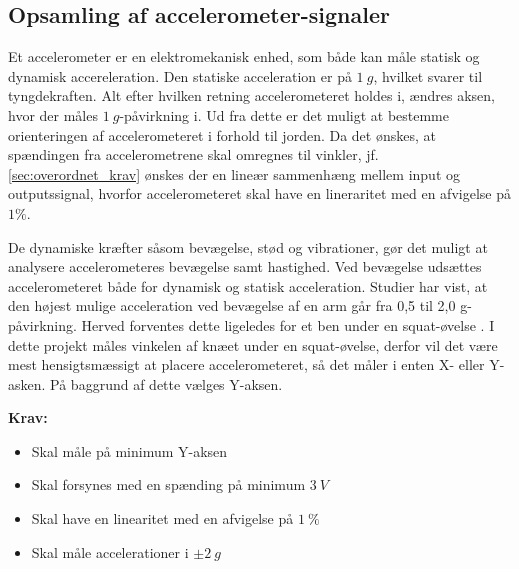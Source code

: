 \subsection{Opsamling af accelerometer-signaler} \label{sec:acc_teori}
Et accelerometer er en elektromekanisk enhed, som både kan måle statisk og dynamisk accereleration. Den statiske acceleration er på $1~g$, hvilket svarer til tyngdekraften. Alt efter hvilken retning accelerometeret holdes i, ændres aksen, hvor der måles $1~g$-påvirkning i. Ud fra dette er det muligt at bestemme orienteringen af accelerometeret i forhold til jorden. Da det ønskes, at spændingen fra accelerometrene skal omregnes til vinkler, jf. \autoref{sec:overordnet_krav} ønskes der en lineær sammenhæng mellem input og outputssignal, hvorfor accelerometeret skal have en lineraritet med en afvigelse på $1\%$. 

De dynamiske kræfter såsom bevægelse, stød og vibrationer, gør det muligt at analysere accelerometeres bevægelse samt hastighed. Ved bevægelse udsættes accelerometeret både for dynamisk og statisk acceleration. Studier har vist, at den højest mulige acceleration ved bevægelse af en arm går fra 0,5 til 2,0 g-påvirkning. Herved forventes dette ligeledes for et ben under en squat-øvelse \citep{bernmarka2002}. I dette projekt måles vinkelen af knæet under en squat-øvelse, derfor vil det være mest hensigtsmæssigt at placere accelerometeret, så det måler i enten X- eller Y-asken. På baggrund af dette vælges Y-aksen.

\vspace{3mm}

\textbf{Krav:}
\begin{itemize}
\item Skal måle på minimum Y-aksen
\item Skal forsynes med en spænding på minimum $3~V$
\item Skal have en linearitet med en afvigelse på $1~\%$
\item Skal måle accelerationer i $\pm 2~g$
\end{itemize}